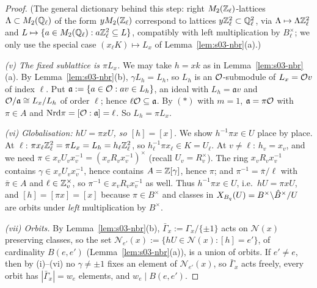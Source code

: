 \begin{proof}
(The general dictionary behind this step: right $M_2(\mathbb{Z}_\ell)$-lattices $\Lambda\subset M_2(\mathbb{Q}_\ell)$ of the form $yM_2(\mathbb{Z}_\ell)$ correspond to lattices
$y\mathbb{Z}_\ell^2\subset\mathbb{Q}_\ell^2$, via $\Lambda\mapsto\Lambda\mathbb{Z}_\ell^2$ and $L\mapsto\{a\in M_2(\mathbb{Q}_\ell):a\mathbb{Z}_\ell^2\subseteq L\}$, compatibly with left multiplication
by $B_\ell^\times$; we only use the special case $(x_\ell K)\mapsto L_x$ of Lemma~\ref{lem:s03-nbr}(a).)

\emph{(v) The fixed sublattice is $\pi L_x$.} We may take $h=xk$ as in Lemma~\ref{lem:s03-nbr}(a). By Lemma~\ref{lem:s03-nbr}(b), $\gamma L_h=L_h$, so $L_h$ is an
$\mathcal{O}$-submodule of $L_x=\mathcal{O} v$ of index $\ell$. Put $\mathfrak a:=\{a\in\mathcal{O}:av\in L_h\}$, an ideal with $L_h=\mathfrak av$ and $\mathcal{O}/\mathfrak a\cong L_x/L_h$ of
order $\ell$; hence $\ell\mathcal{O}\subseteq\mathfrak a$. By $(*)$ with $m=1$, $\mathfrak a=\pi\mathcal{O}$ with $\pi\in A$ and $\mathrm{Nrd}\pi=[\mathcal{O}:\mathfrak a]=\ell$. So
$L_h=\pi L_x$.

\emph{(vi) Globalisation: $hU=\pi xU$, so $[h]=[x]$.} We show $h^{-1}\pi x\in U$ place by place. At $\ell$: $\pi x_\ell\mathbb{Z}_\ell^2=\pi L_x=L_h=h_\ell\mathbb{Z}_\ell^2$,
so $h_\ell^{-1}\pi x_\ell\in K=U_\ell$. At $v\ne\ell$: $h_v=x_v$, and we need $\pi\in x_vU_vx_v^{-1}=(x_vR_vx_v^{-1})^\times$ (recall $U_v=R_v^\times$). The ring
$x_vR_vx_v^{-1}$ contains $\gamma\in x_vU_vx_v^{-1}$, hence contains $A=\mathbb{Z}[\gamma]$, hence $\pi$; and $\pi^{-1}=\bar\pi/\ell$ with $\bar\pi\in A$ and
$\ell\in\mathbb{Z}_v^\times$, so $\pi^{-1}\in x_vR_vx_v^{-1}$ as well. Thus $h^{-1}\pi x\in U$, i.e.\ $hU=\pi xU$, and $[h]=[\pi x]=[x]$ because $\pi\in B^\times$ and
classes in $X_{B_q}(U)=B^\times\backslash\hat{B}^\times/U$ are orbits under \emph{left} multiplication by $B^\times$.

\emph{(vii) Orbits.} By Lemma~\ref{lem:s03-nbr}(b), $\bar\Gamma_x:=\Gamma_x/\{\pm1\}$ acts on $\mathcal N(x)$ preserving classes, so the set
$\mathcal N_{e'}(x):=\{hU\in\mathcal N(x):[h]=e'\}$, of cardinality $B(e,e')$ (Lemma~\ref{lem:s03-nbr}(a)), is a union of orbits. If $e'\ne e$, then by (i)--(vi)
no $\gamma\ne\pm1$ fixes an element of $\mathcal N_{e'}(x)$, so $\bar\Gamma_x$ acts freely, every orbit has $|\bar\Gamma_x|=w_e$ elements, and
$w_e\mid B(e,e')$.
\end{proof}

